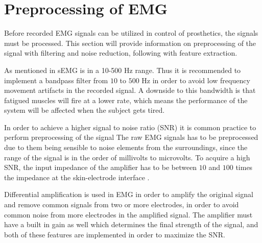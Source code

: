 \section{Preprocessing of EMG}

Before recorded EMG signals can be utilized in control of prosthetics, the signals must be processed. This section will provide information on preprocessing of the signal with filtering and noise reduction, following with feature extraction.

As mentioned in  sEMG is in a 10-500 Hz range. Thus it is recommended to implement a bandpass filter from $10$ to $500$ Hz in order to avoid low frequency movement artifacts in the recorded signal. 
A downside to this bandwidth is that fatigued muscles will fire at a lower rate, which means the performance of the system will be affected when the subject gets tired. \cite{cram2012} %

In order to achieve a higher signal to noise ratio (SNR) it is common practice to perform preprocessing of the signal%
The raw EMG signals has to be preprocessed due to them being sensible to noise elements from the surroundings, since the range of the signal is in the order of millivolts to microvolts. To acquire a high SNR, the input impedance of the amplifier has to be between $10$ and $100$ times the impedance at the skin-electrode interface \cite{cram2012}.


Differential amplification is used in EMG in order to amplify the original signal and remove common signals from two or more electrodes, in order to avoid common noise from more electrodes in the amplified signal. The amplifier must have a built in gain as well which determines the final strength of the signal, and both of these features are implemented in order to maximize the SNR. 


